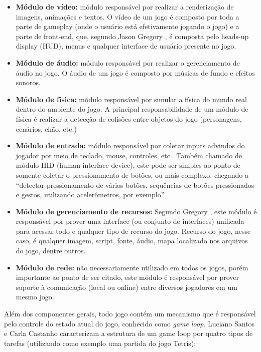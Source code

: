 \begin{itemize}
\item \textbf{Módulo de vídeo:} módulo responsável por realizar a renderização de imagens, animações e textos. O vídeo de um jogo é composto por toda a parte de gameplay (onde o usuário está efetivamente jogando o jogo) e a parte de front-end, que, segundo Jason Gregory \cite[p.~39]{gregory2014game}, é composta pelo heads-up display (HUD), menus e qualquer interface de usuário presente no jogo.

\item \textbf{Módulo de áudio:} módulo responsável por realizar o gerenciamento de áudio no jogo. O áudio de um jogo é composto por músicas de fundo e efeitos sonoros.

\item \textbf{Módulo de física:} módulo responsável por simular a física do mundo real dentro do ambiente do jogo. A principal responsabilidade de um módulo de física é realizar a detecção de colisões entre objetos do jogo (personagens, cenários, chão, etc.)

\item \textbf{Módulo de entrada:} módulo responsável por coletar inputs advindos do jogador por meio de teclado, mouse, controles, etc.. Também chamado de módulo HID (human interface device), este pode ser simples ao ponto de somente coletar o pressionamento de botões, ou mais complexo, chegando a “detectar pressionamento de vários botões, sequências de botões pressionados e gestos, utilizando acelerômetros, por exemplo” \cite[p.~43]{gregory2014game}

\item \textbf{Módulo de gerenciamento de recursos:} Segundo Gregory \cite[p.~35]{gregory2014game}, este módulo é responsável por prover uma interface (ou conjunto de interfaces) unificada para acessar todo e qualquer tipo de recurso do jogo. Recurso do jogo, nesse caso, é qualquer imagem, script, fonte, áudio, mapa localizado nos arquivos do jogo, dentre outros.

\item \textbf{Módulo de rede:} não necessariamente utilizado em todos os jogos, porém importante ao ponto de ser citado, este módulo é responsável por prover suporte à comunicação (local ou online) entre diversos jogadores em um mesmo jogo.
\end{itemize}


Além dos componentes gerais, todo jogo contém um mecanismo que é responsável pelo controle do estado atual do jogo, conhecido como \textit{game loop}. Luciano Santos e Carla Castanho \cite{gameplayunb} caracterizam a estrutura de um game loop por quatro tipos de tarefas (utilizando como exemplo uma partida do jogo Tetris):

